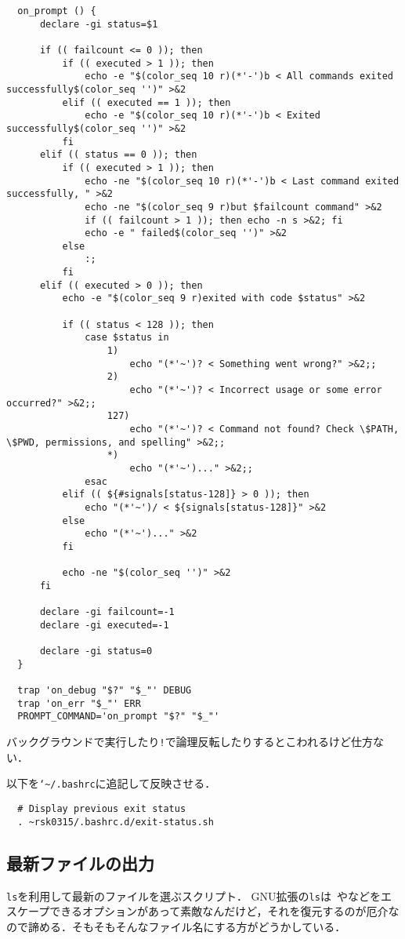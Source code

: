 \documentclass[a4paper]{jsarticle}
\begin{document}
\begin{lstlisting}
  on_prompt () {
      declare -gi status=$1
  
      if (( failcount <= 0 )); then
          if (( executed > 1 )); then
              echo -e "$(color_seq 10 r)(*'-')b < All commands exited successfully$(color_seq '')" >&2
          elif (( executed == 1 )); then
              echo -e "$(color_seq 10 r)(*'-')b < Exited successfully$(color_seq '')" >&2
          fi
      elif (( status == 0 )); then
          if (( executed > 1 )); then
              echo -ne "$(color_seq 10 r)(*'-')b < Last command exited successfully, " >&2
              echo -ne "$(color_seq 9 r)but $failcount command" >&2
              if (( failcount > 1 )); then echo -n s >&2; fi
              echo -e " failed$(color_seq '')" >&2
          else
              :;
          fi
      elif (( executed > 0 )); then
          echo -e "$(color_seq 9 r)exited with code $status" >&2
  
          if (( status < 128 )); then
              case $status in
                  1)
                      echo "(*'~')? < Something went wrong?" >&2;;
                  2)
                      echo "(*'~')? < Incorrect usage or some error occurred?" >&2;;
                  127)
                      echo "(*'~')? < Command not found? Check \$PATH, \$PWD, permissions, and spelling" >&2;;
                  *)
                      echo "(*'~')..." >&2;;
              esac
          elif (( ${#signals[status-128]} > 0 )); then
              echo "(*'~')/ < ${signals[status-128]}" >&2
          else
              echo "(*'~')..." >&2
          fi
  
          echo -ne "$(color_seq '')" >&2
      fi
  
      declare -gi failcount=-1
      declare -gi executed=-1
  
      declare -gi status=0
  }
  
  trap 'on_debug "$?" "$_"' DEBUG
  trap 'on_err "$_"' ERR
  PROMPT_COMMAND='on_prompt "$?" "$_"'
\end{lstlisting}
バックグラウンドで実行したり\texttt{!}で論理反転したりするとこわれるけど仕方ない．

以下を\texttt{\char`\~{}/.bashrc}に追記して反映させる．
\begin{lstlisting}
  # Display previous exit status
  . ~rsk0315/.bashrc.d/exit-status.sh
\end{lstlisting}

\subsection{最新ファイルの出力}
\texttt{ls}を利用して最新のファイルを選ぶスクリプト．
GNU拡張の\texttt{ls}は\texttt{ }や\texttt{\textquotesingle{}}などをエスケープできるオプションがあって素敵なんだけど，それを復元するのが厄介なので諦める．そもそもそんなファイル名にする方がどうかしている．
\end{document}
